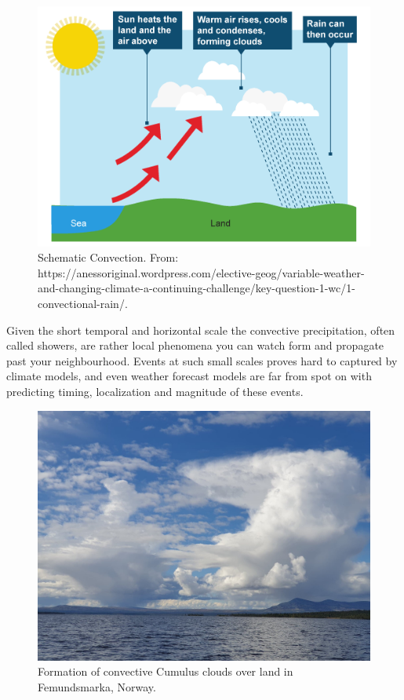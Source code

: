 \begin{figure}[hbt!]
    \centering
    \includegraphics[scale=0.4]{figures/convection-rain.png}
    \caption{Schematic Convection. From: https://anessoriginal.wordpress.com/elective-geog/variable-weather-and-changing-climate-a-continuing-challenge/key-question-1-wc/1-convectional-rain/.
    \cite{convection}}
    \label{fig:convection}
\end{figure}


Given the short temporal and horizontal scale the convective precipitation, often called showers, are rather local phenomena you can watch form and propagate past your neighbourhood. Events at such small scales proves hard to captured by climate models, and even weather forecast models are far from spot on with predicting timing, localization and magnitude of these events. 

\begin{figure}[hbt!]
    \centering
    \includegraphics[scale=0.2]{figures/cumulus_bilde.jpg}
    \caption{Formation of convective Cumulus clouds over land in Femundsmarka, Norway.
    \cite{cumulus}}
    \label{fig:cumulus}
\end{figure}

